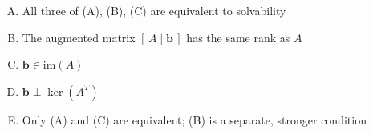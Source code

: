 \documentclass[12pt]{amsart}
\begin{document}
\begin{enumerate}[(A)]
\item All three of (A), (B), (C) are equivalent to solvability
\item The augmented matrix $[\,A \mid \mathbf{b}\,]$ has the same rank as $A$
\item $\mathbf{b} \in \mathrm{im}(A)$
\item $\mathbf{b} \perp \ker(A^T)$
\item Only (A) and (C) are equivalent; (B) is a separate, stronger condition
\end{enumerate}

%
%
%
%
%
%
%
\end{document}
